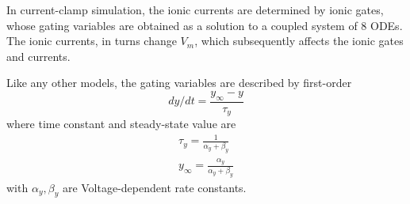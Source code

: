In current-clamp simulation, the ionic currents are determined by
ionic gates, whose gating variables are obtained as a solution to a
coupled system of 8 ODEs. The ionic currents, in turns change $V_m$,
which subsequently affects the ionic gates and currents.

Like any other models, the gating variables are described by
first-order
\begin{equation}
  \label{eq:726}
  dy/dt = \frac{y_\infty-y}{\tau_y}
\end{equation}
where time constant and steady-state value are
\begin{equation}
  \label{eq:727}
  \begin{split}
    \tau_y = \frac{1}{\alpha_y+\beta_y} \\
    y_\infty = \frac{\alpha_y}{\alpha_y+\beta_y} 
  \end{split}
\end{equation}
with $\alpha_y, \beta_y$ are Voltage-dependent rate constants. 

